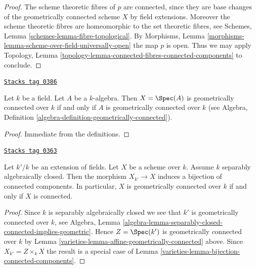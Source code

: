 \begin{proof}
The scheme theoretic fibres of $p$ are connected, since they
are base changes of the geometrically connected scheme $X$ by
field extensions. Moreover the scheme theoretic fibres are
homeomorphic to the set theoretic fibres, see
Schemes, Lemma \ref{schemes-lemma-fibre-topological}.
By
Morphisms, Lemma \ref{morphisms-lemma-scheme-over-field-universally-open}
the map $p$ is open.
Thus we may apply Topology,
Lemma \ref{topology-lemma-connected-fibres-connected-components}
to conclude.
\end{proof}

\begin{lemma}
\label{varieties-lemma-affine-geometrically-connected}
\href{https://stacks.math.columbia.edu/tag/0386}{\texttt{Stacks tag 0386}}

Let $k$ be a field.
Let $A$ be a $k$-algebra.
Then $X = \Spec(A)$ is geometrically connected over $k$
if and only if $A$ is geometrically connected over $k$ (see
Algebra, Definition \ref{algebra-definition-geometrically-connected}).
\end{lemma}

\begin{proof}
Immediate from the definitions.
\end{proof}

\begin{lemma}
\label{varieties-lemma-separably-closed-field-connected-components}
\href{https://stacks.math.columbia.edu/tag/0363}{\texttt{Stacks tag 0363}}

Let $k'/k$ be an extension of fields.
Let $X$ be a scheme over $k$.
Assume $k$ separably algebraically closed.
Then the morphism $X_{k'} \to X$ induces a bijection of connected
components. In particular, $X$ is geometrically connected over $k$
if and only if $X$ is connected.
\end{lemma}

\begin{proof}

Since $k$ is separably algebraically closed we see that
$k'$ is geometrically connected over $k$, see
Algebra,
Lemma \ref{algebra-lemma-separably-closed-connected-implies-geometric}.
Hence $Z = \Spec(k')$ is geometrically connected over $k$ by
Lemma \ref{varieties-lemma-affine-geometrically-connected}
above. Since $X_{k'} = Z \times_k X$ the result is a special case of
Lemma \ref{varieties-lemma-bijection-connected-components}.
\end{proof}

